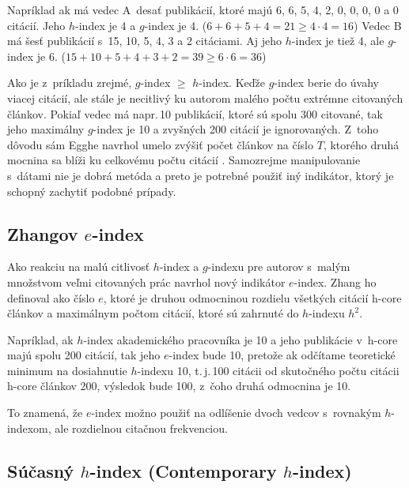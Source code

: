 Napríklad ak má vedec A~desať publikácií, ktoré majú 6, 6, 5, 4, 2, 0, 0, 0, 0 a
0 citácií.  Jeho $h$-index je 4 a $g$-index je 4.
($6+6+5+4 = 21 \geq 4\cdot4=16$) Vedec B má šesť publikácií s~15, 10, 5, 4, 3 a
2 citáciami.  Aj jeho $h$-index je tiež 4, ale $g$-index je 6.
($15+10+5+4+3+2 = 39 \geq 6\cdot6 = 36$)

Ako je z~príkladu zrejmé, $g$-index $\geq$ $h$-index.  Keďže $g$-index berie do
úvahy viacej citácií, ale stále je necitlivý ku autorom malého počtu extrémne
citovaných článkov.  Pokiaľ vedec má napr.\,10 publikácií, ktoré sú spolu 300
citované, tak jeho maximálny $g$-index je 10 a zvyšných 200 citácií je
ignorovaných.  Z~toho dôvodu sám Egghe navrhol umelo zvýšiť počet článkov na
číslo $T$, ktorého druhá mocnina sa blíži ku celkovému počtu citácií
\citep{Egghe2006}.  Samozrejme manipulovanie s~dátami nie je dobrá metóda a
preto je potrebné použiť iný indikátor, ktorý je schopný zachytiť podobné
prípady.


\subsection{Zhangov $e$-index}
\label{sec:e-index}

Ako reakciu na malú citlivosť $h$-index a $g$-indexu pre autorov s~malým
množstvom veľmi citovaných prác \citet{Zhang2009} navrhol nový indikátor
$e$-index.  Zhang ho definoval ako číslo $e$, ktoré je druhou odmocninou
rozdielu všetkých citácií h-core článkov a maximálnym počtom citácií, ktoré sú
zahrnuté do $h$-indexu $h^2$.

Napríklad, ak $h$-index akademického pracovníka je 10 a jeho publikácie v~h-core
majú spolu 200 citácií, tak jeho $e$-index bude 10, pretože ak odčítame
teoretické minimum na dosiahnutie $h$-indexu 10, t.\,j.\,100 citácii od skutočného
počtu citácii h-core článkov 200, výsledok bude 100, z~čoho druhá odmocnina je
10.

To znamená, že $e$-index možno použiť na odlíšenie dvoch vedcov s~rovnakým
$h$-indexom, ale rozdielnou citačnou frekvenciou.


\subsection{Súčasný $h$-index (Contemporary $h$-index)}
\label{sec:hc-index}

